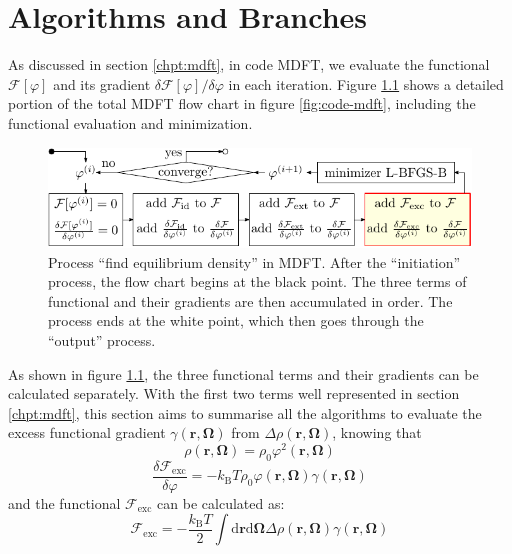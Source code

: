 
\chapter{Algorithms and Branches\label{chpt:algorithms-and-branches}}

As discussed in section \ref{chpt:mdft}, in code MDFT, we evaluate
the functional $\mathcal{F}[\varphi]$ and its gradient $\delta\mathcal{F}[\varphi]/\delta\varphi$
in each iteration. Figure \ref{fig:find-eq-den} shows a detailed
portion of the total MDFT flow chart in figure \ref{fig:code-mdft},
including the functional evaluation and minimization.

\begin{figure}[h]
\begin{centering}
\includegraphics{_figure/find_equilibium_density}
\par\end{centering}
\caption[Process ``find equilibrium density'' in MDFT]{Process ``find equilibrium density'' in MDFT. After the ``initiation''
process, the flow chart begins at the black point. The three terms
of functional and their gradients are then accumulated in order. The
process ends at the white point, which then goes through the ``output''
process. \label{fig:find-eq-den}}
\end{figure}

As shown in figure \ref{fig:find-eq-den}, the three functional terms
and their gradients can be calculated separately. With the first
two terms well represented in section \ref{chpt:mdft}, this section
aims to summarise all the algorithms to evaluate the excess functional
gradient $\gamma(\mathbf{r},\mathbf{\Omega})$ from $\Delta\rho(\mathbf{r},\mathbf{\Omega})$,
knowing that
\begin{equation}
\rho(\mathbf{r},\mathbf{\Omega})=\rho_{0}\varphi^{2}(\mathbf{r},\mathbf{\Omega})
\end{equation}
\begin{equation}
\frac{\delta\mathcal{F}_{\mathrm{exc}}}{\delta\varphi}=-k_{\mathrm{B}}T\rho_{0}\varphi(\mathbf{r},\mathbf{\Omega})\gamma(\mathbf{r},\mathbf{\Omega})
\end{equation}
and the functional $\mathcal{F}_{\mathrm{exc}}$ can be calculated
as:
\begin{equation}
\mathcal{F}_{\mathrm{exc}}=-\frac{k_{\mathrm{B}}T}{2}\int\mathrm{d}\mathbf{r}\mathrm{d}\mathbf{\Omega}\Delta\rho(\mathbf{r},\mathbf{\Omega})\gamma(\mathbf{r},\mathbf{\Omega})
\end{equation}

